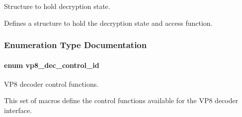 Structure to hold decryption state. 

Defines a structure to hold the decryption state and access function. 

\subsubsection{Enumeration Type Documentation}
\hypertarget{group__vp8__decoder_gaf9dd3f2e6d1412106ee791af768e57c1}{
\paragraph[{vp8\+\_\+dec\+\_\+control\+\_\+id}]{\setlength{\rightskip}{0pt plus 5cm}enum {\bf vp8\+\_\+dec\+\_\+control\+\_\+id}}}\label{group__vp8__decoder_gaf9dd3f2e6d1412106ee791af768e57c1}


V\+P8 decoder control functions. 

This set of macros define the control functions available for the V\+P8 decoder interface.

